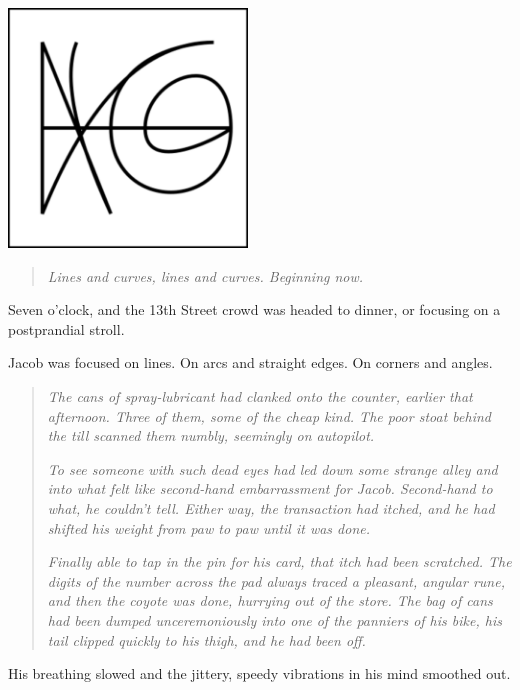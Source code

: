 \vfill
\newpage

\begin{paracol}{2}
\begin{rightcolumn}
    \null
    \vfill
    \noindent\includegraphics[width=2.5in]{assets/3.png}

    \begin{quote}
    \emph{Lines and curves, lines and curves. Beginning now.}
    \end{quote}

    Seven o'clock, and the 13th Street crowd was headed to dinner, or focusing on a postprandial stroll.

    Jacob was focused on lines. On arcs and straight edges. On corners and angles.

    \begin{quote}
    \emph{The cans of spray-lubricant had clanked onto the counter, earlier that afternoon. Three of them, some of the cheap kind. The poor stoat behind the till scanned them numbly, seemingly on autopilot.}

    \emph{To see someone with such dead eyes had led down some strange alley and into what felt like second-hand embarrassment for Jacob. Second-hand to what, he couldn't tell. Either way, the transaction had itched, and he had shifted his weight from paw to paw until it was done.}

    \emph{Finally able to tap in the pin for his card, that itch had been scratched. The digits of the number across the pad always traced a pleasant, angular rune, and then the coyote was done, hurrying out of the store. The bag of cans had been dumped unceremoniously into one of the panniers of his bike, his tail clipped quickly to his thigh, and he had been off.}
    \end{quote}

    His breathing slowed and the jittery, speedy vibrations in his mind smoothed out.


\end{rightcolumn}
\end{paracol}
